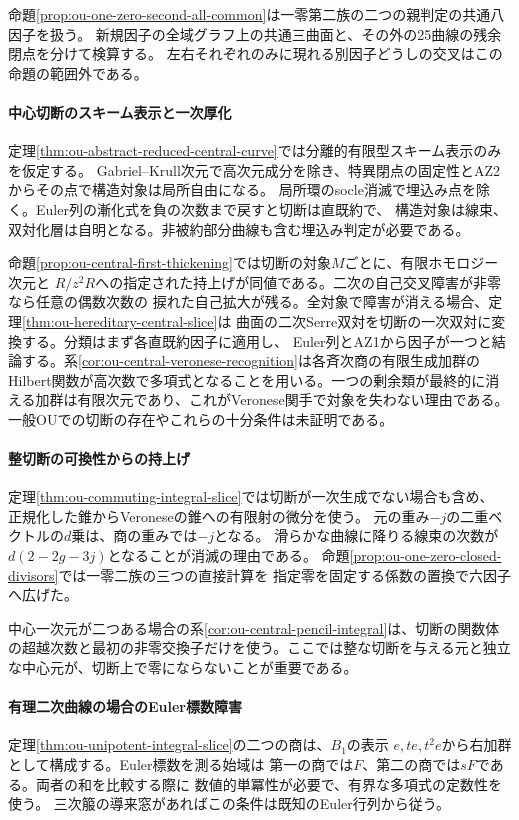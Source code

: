 \documentclass[11pt,a4paper]{ltjsarticle}
\begin{document}
命題\ref{prop:ou-one-zero-second-all-common}は一零第二族の二つの親判定の共通八因子を扱う。
新規因子の全域グラフ上の共通三曲面と、その外の25曲線の残余閉点を分けて検算する。
左右それぞれのみに現れる別因子どうしの交叉はこの命題の範囲外である。

\paragraph{中心切断のスキーム表示と一次厚化}
定理\ref{thm:ou-abstract-reduced-central-curve}では分離的有限型スキーム表示のみを仮定する。
Gabriel--Krull次元で高次元成分を除き、特異閉点の固定性とAZ2からその点で構造対象は局所自由になる。
局所環のsocle消滅で埋込み点を除く。Euler列の漸化式を負の次数まで戻すと切断は直既約で、
構造対象は線束、双対化層は自明となる。非被約部分曲線も含む埋込み判定が必要である。

命題\ref{prop:ou-central-first-thickening}では切断の対象$M$ごとに、有限ホモロジー次元と
$R/z^2R$への指定された持上げが同値である。二次の自己交叉障害が非零なら任意の偶数次数の
捩れた自己拡大が残る。全対象で障害が消える場合、定理\ref{thm:ou-hereditary-central-slice}は
曲面の二次Serre双対を切断の一次双対に変換する。分類はまず各直既約因子に適用し、
Euler列とAZ1から因子が一つと結論する。系\ref{cor:ou-central-veronese-recognition}は各斉次商の有限生成加群のHilbert関数が高次数で多項式となることを用いる。一つの剰余類が最終的に消える加群は有限次元であり、これがVeronese関手で対象を失わない理由である。一般OUでの切断の存在やこれらの十分条件は未証明である。

\paragraph{整切断の可換性からの持上げ}
定理\ref{thm:ou-commuting-integral-slice}では切断が一次生成でない場合も含め、
正規化した錐からVeroneseの錐への有限射の微分を使う。
元の重み$-j$の二重ベクトルの$d$乗は、商の重みでは$-j$となる。
滑らかな曲線に降りる線束の次数が$d(2-2g-3j)$となることが消滅の理由である。
命題\ref{prop:ou-one-zero-closed-divisors}では一零二族の三つの直接計算を
指定零を固定する係数の置換で六因子へ広げた。

中心一次元が二つある場合の系\ref{cor:ou-central-pencil-integral}は、切断の関数体の超越次数と最初の非零交換子だけを使う。ここでは整な切断を与える元と独立な中心元が、切断上で零にならないことが重要である。

\paragraph{有理二次曲線の場合のEuler標数障害}
定理\ref{thm:ou-unipotent-integral-slice}の二つの商は、$B_1$の表示
$e,te,t^2e$から右加群として構成する。Euler標数を測る始域は
第一の商では$F$、第二の商では$sF$である。両者の和を比較する際に
数値的単冪性が必要で、有界な多項式の定数性を使う。
三次箙の導来窓があればこの条件は既知のEuler行列から従う。
\end{document}
